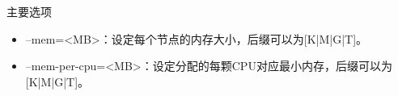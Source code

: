 \begin{frame}{主要选项}
\begin{itemize}
%
%
%
%
%
%
%
%
   \item --mem=<MB>：设定每个节点的内存大小，后缀可以为[K|M|G|T]。
   \item --mem-per-cpu=<MB>：设定分配的每颗CPU对应最小内存，后缀可以为[K|M|G|T]。

\end{itemize}
\end{frame}
